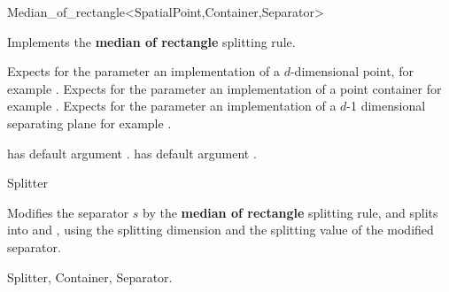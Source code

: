 
\begin{ccRefFunctionObjectClass}{Median_of_rectangle<SpatialPoint,Container,Separator>}  %

\ccDefinition
Implements the {\bf median of rectangle} splitting rule.

\ccParameters

Expects for the parameter  an implementation of a $d$-dimensional point,
for example . Expects for the parameter  an implementation
of a point container for example .
Expects for the parameter  an implementation of a $d$-1 dimensional 
separating plane for example .

 has default argument .
 has default argument . 



\ccIsModel

Splitter

\ccTypes




\ccOperations

{Modifies the separator $s$ by the {\bf median of rectangle} splitting rule, 
and splits  into  and ,
using the splitting dimension and the splitting value of the modified separator.
}

\ccSeeAlso

Splitter, Container, Separator.
\end{ccRefFunctionObjectClass}





